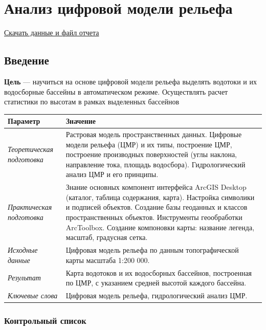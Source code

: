 \documentclass[12pt,]{book}
\begin{document}
\hypertarget{dem}{%
\chapter{Анализ цифровой модели рельефа}\label{dem}}

\href{http://autolab.geogr.msu.ru/gis/data/Ex15.zip}{Скачать данные и файл отчета}

\hypertarget{dem-intro}{%
\section{Введение}\label{dem-intro}}

\textbf{Цель} --- научиться на основе цифровой модели рельефа выделять водотоки и их водосборные бассейны в автоматическом режиме. Осуществлять расчет статистики по высотам в рамках выделенных бассейнов

\begin{longtable}[]{@{}ll@{}}
\toprule
Параметр & Значение\tabularnewline
\midrule
\endhead
\emph{Теоретическая подготовка} & Растровая модель пространственных данных. Цифровые модели рельефа (ЦМР) и их типы, построение ЦМР, построение производных поверхностей (углы наклона, направление тока, площадь водосбора). Гидрологический анализ ЦМР и его принципы.\tabularnewline
\emph{Практическая подготовка} & Знание основных компонент интерфейса ArcGIS Desktop (каталог, таблица содержания, карта). Настройка символики и подписей объектов. Создание базы геоданных и классов пространственных объектов. Инструменты геообработки ArcToolbox. Создание компоновки карты: название легенда, масштаб, градусная сетка.\tabularnewline
\emph{Исходные данные} & Цифровая модель рельефа по данным топографической карты масштаба 1:200 000.\tabularnewline
\emph{Результат} & Карта водотоков и их водосборных бассейнов, построенная по ЦМР, с указанием средней высотой каждого бассейна.\tabularnewline
\emph{Ключевые слова} & Цифровая модель рельефа, гидрологический анализ ЦМР.\tabularnewline
\bottomrule
\end{longtable}

\hypertarget{dem-control}{%
\subsection{Контрольный список}\label{dem-control}}
\end{document}
